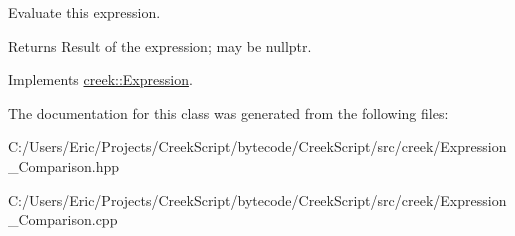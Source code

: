 Evaluate this expression. 

\begin{DoxyReturn}{Returns}
Result of the expression; may be {\ttfamily nullptr}. 
\end{DoxyReturn}


Implements \hyperlink{classcreek_1_1_expression_a3c7fe4a04e24c8d907f918240e2bf43d}{creek\+::\+Expression}.



The documentation for this class was generated from the following files\+:\begin{DoxyCompactItemize}
\item 
C\+:/\+Users/\+Eric/\+Projects/\+Creek\+Script/bytecode/\+Creek\+Script/src/creek/Expression\+\_\+\+Comparison.\+hpp\item 
C\+:/\+Users/\+Eric/\+Projects/\+Creek\+Script/bytecode/\+Creek\+Script/src/creek/Expression\+\_\+\+Comparison.\+cpp\end{DoxyCompactItemize}
